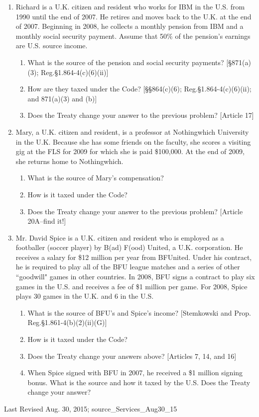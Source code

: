 \begin{select}
\begin{enumerate}
				\item Richard is a U.K. citizen and resident who works for IBM in the U.S. from 1990 until the end of 2007.  He retires and moves back to the U.K. at the end of 2007.  Beginning in 2008, he collects a monthly pension from IBM and a monthly social security payment.   Assume that 50\% of the pension's earnings are U.S. source income.			
				\begin{enumerate}
					\item What is the source of the pension and social security payments?   [\S 871(a)(3); Reg.\@ \S 1.864-4(c)(6)(ii)]
					\item How are they taxed under the Code?  [\S\S 864(c)(6); Reg.\@ \S 1.864-4(c)(6)(ii); and 871(a)(3) and (b)]
					\item Does the Treaty change your answer to the previous problem? [Article 17]
				\end{enumerate}
				
				\item Mary, a U.K. citizen and resident, is a professor at Nothingwhich University in the U.K.  Because she has some friends on the faculty, she scores a visiting gig at the FLS for 2009 for which she is paid \$100,000.  At the end of 2009, she returns home to Nothingwhich.  
				\begin{enumerate}
					\item What is the source of Mary's compensation?   
					\item How is it taxed under the Code? 
					\item Does the Treaty change your answer to the previous problem? [Article 20A--find it!]
				\end{enumerate}

			\item Mr. David Spice is a U.K. citizen and resident who is employed as a footballer (soccer player) by B(ad) F(ood) United, a U.K. corporation.  He receives a salary for \$12 million per year from BFUnited.  Under his contract, he is required to play all of the BFU league matches and a series of other ``goodwill" games in other countries.  In 2008, BFU signs a contract to play six games in the U.S. and receives a fee of \$1 million per game.  For 2008, Spice plays 30 games in the U.K. and 6 in the U.S.
		\begin{enumerate}
			\item What is the source of BFU's and Spice's income? [Stemkowski and Prop. Reg.\@ \S 1.861-4(b)(2)(ii)(G)]
			\item How is it taxed under the Code? 
			\item Does the Treaty change your answers above? [Articles 7, 14, and 16]
			\item When Spice signed with BFU in 2007, he received a \$1 million signing bonus.  What is the source and how it taxed by the U.S.  Does the Treaty change your answer?
		\end{enumerate}	
				
			\end{enumerate}
		\end{select}

\begin{framed}
Last Revised Aug. 30, 2015; source\_Services\_Aug30\_15
\end{framed}
